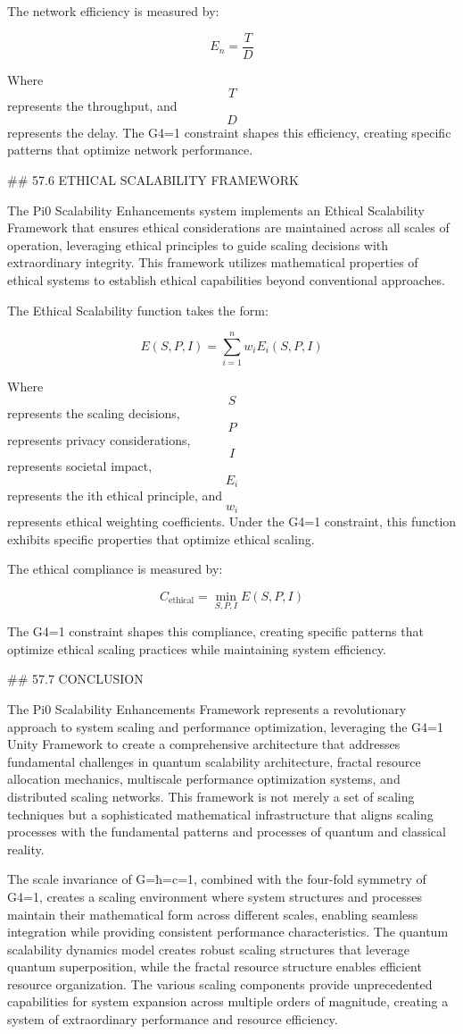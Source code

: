 The network efficiency is measured by:

$$ E_n = \frac{T}{D} $$

Where $$ T $$ represents the throughput, and $$ D $$ represents the delay. The G4=1 constraint shapes this efficiency, creating specific patterns that optimize network performance.

## 57.6 ETHICAL SCALABILITY FRAMEWORK

The Pi0 Scalability Enhancements system implements an Ethical Scalability Framework that ensures ethical considerations are maintained across all scales of operation, leveraging ethical principles to guide scaling decisions with extraordinary integrity. This framework utilizes mathematical properties of ethical systems to establish ethical capabilities beyond conventional approaches.

The Ethical Scalability function takes the form:

$$ E(S, P, I) = \sum_{i=1}^{n} w_i E_i(S, P, I) $$

Where $$ S $$ represents the scaling decisions, $$ P $$ represents privacy considerations, $$ I $$ represents societal impact, $$ E_i $$ represents the ith ethical principle, and $$ w_i $$ represents ethical weighting coefficients. Under the G4=1 constraint, this function exhibits specific properties that optimize ethical scaling.

The ethical compliance is measured by:

$$ C_{\text{ethical}} = \min_{S, P, I} E(S, P, I) $$

The G4=1 constraint shapes this compliance, creating specific patterns that optimize ethical scaling practices while maintaining system efficiency.

## 57.7 CONCLUSION

The Pi0 Scalability Enhancements Framework represents a revolutionary approach to system scaling and performance optimization, leveraging the G4=1 Unity Framework to create a comprehensive architecture that addresses fundamental challenges in quantum scalability architecture, fractal resource allocation mechanics, multiscale performance optimization systems, and distributed scaling networks. This framework is not merely a set of scaling techniques but a sophisticated mathematical infrastructure that aligns scaling processes with the fundamental patterns and processes of quantum and classical reality.

The scale invariance of G=ħ=c=1, combined with the four-fold symmetry of G4=1, creates a scaling environment where system structures and processes maintain their mathematical form across different scales, enabling seamless integration while providing consistent performance characteristics. The quantum scalability dynamics model creates robust scaling structures that leverage quantum superposition, while the fractal resource structure enables efficient resource organization. The various scaling components provide unprecedented capabilities for system expansion across multiple orders of magnitude, creating a system of extraordinary performance and resource efficiency.


